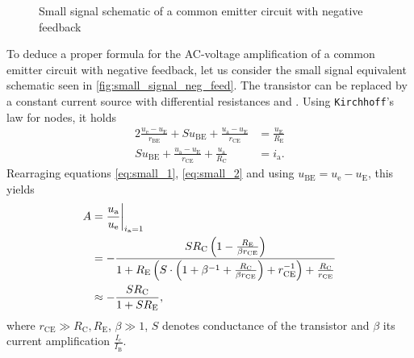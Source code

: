 \begin{figure}[tbp]
	\centering
	\caption{Small signal schematic of a common emitter circuit with negative feedback}
	\label{fig:small_signal_neg_feed}
\end{figure}

To deduce a proper formula for the AC-voltage amplification of a common emitter circuit with negative feedback, let us consider the small signal equivalent schematic seen in \autoref{fig:small_signal_neg_feed}.
The transistor can be replaced by a constant current source with differential resistances  and .
Using \texttt{Kirchhoff}'s law for nodes, it holds
\begin{alignat}{2}
	\frac{u_\text{e}-u_\text{E}}{r_\text{BE}}+Su_\text{BE}+\frac{u_\text{a}-u_\text{E}}{r_\text{CE}} &= \frac{u_\text{E}}{R_\text{E}} \label{eq:small_1}\\
	Su_\text{BE}+\frac{u_\text{a}-u_\text{E}}{r_\text{CE}} + \frac{u_\text{a}}{R_\text{C}}&= i_\text{a}. \label{eq:small_2}
\end{alignat}
Rearraging equations \ref{eq:small_1}, \ref{eq:small_2} and using $u_\text{BE}=u_\text{e}-u_\text{E}$, this yields
\begin{align}
	A&=\frac{u_\text{a}}{u_\text{e}}\at[\bigg]{i_\text{a}=1} \nonumber \\
	&=-\frac{SR_\text{C}\left(1-\frac{R_\text{E}}{\beta r_\text{CE}}\right)}{1+R_\text{E}\left(S\cdot\left(1+\beta^{-1}+\frac{R_\text{C}}{\beta r_\text{CE}}\right)+r_\text{CE}^{-1}\right)+\frac{R_\text{C}}{r_\text{CE}}} \nonumber \\
	&\approx -\frac{SR_\text{C}}{1+SR_\text{E}}, \label{eq:amp_neg_fb}
\end{align}
where $r_\text{CE}\gg R_\text{C},R_\text{E}$, $\beta\gg 1$, $S$ denotes conductance of the transistor and $\beta$ its current amplification $\frac{I_\text{c}}{I_\text{B}}$.
